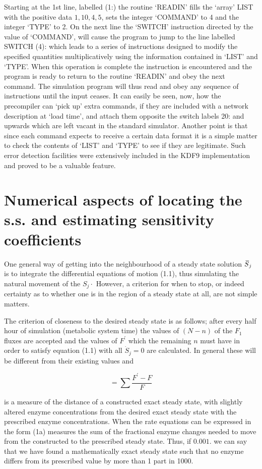 Starting at the 1st line, labelled (1:) the routine `READIN' fills the `array' LIST with the positive data $1,10,4,5$, sets the integer `COMMAND' to 4 and the integer `TYPE' to 2. On the next line the `SWITCH' instruction directed by the value of `COMMAND', will cause the program to jump to the line labelled SWITCH (4): which leads to a series of instructions designed to modify the specified quantities multiplicatively using the information contained in `LIST' and `TYPE'. When this operation is complete the instruction  is encountered and the program is ready to return to the routine `READIN' and obey the next command. The simulation program will thus read and obey any sequence of instructions until the input ceases. It can easily be seen, now, how the precompiler can `pick up' extra commands, if they are included with a network description at `load time', and attach them opposite the switch labels 20: and upwards which are left vacant in the standard simulator. Another point is that since each command expects to receive a certain data format it is a simple matter to check the contents of `LIST' and `TYPE' to see if they are legitimate. Such error detection facilities were extensively included in the KDF9 implementation and proved to be a valuable feature.

\section{Numerical aspects of locating the s.s. and estimating sensitivity coefficients}

One general way of getting into the neighbourhood of a steady state solution $\,\overline{\!{S}}_{j}$ is to integrate the differential equations of motion (1.1), thus simulating the natural movement of the $S_{j} \cdot$ However, a criterion for when to stop, or indeed certainty as to whether one is in the region of a steady state at all, are not simple matters.

The criterion of closeness to the desired steady state is as follows; after every half hour of simulation (metabolic system time) the values of $(N - n)$ of the $F_{1}$ fluxes are accepted and the values of $F^{\prime}$ which the remaining $n$ must have in order to satisfy equation (1.1) with all $\dot{S}_{j}=0$ are calculated. In general these will be different from their existing values and

 $$=\sum \frac{F^{\prime}-F}{F} $$

is a measure of the distance of a constructed exact steady state, with slightly altered enzyme concentrations from the desired exact steady state with the prescribed enzyme concentrations. When the rate equations can be expressed in the form (1a) measures the sum of the fractional enzyme changes needed to move from the constructed to the prescribed steady state. Thus, if $0.001$. we can say that we have found a mathematically exact steady state such that no enzyme differs from its prescribed value by more than 1 part in 1000.

